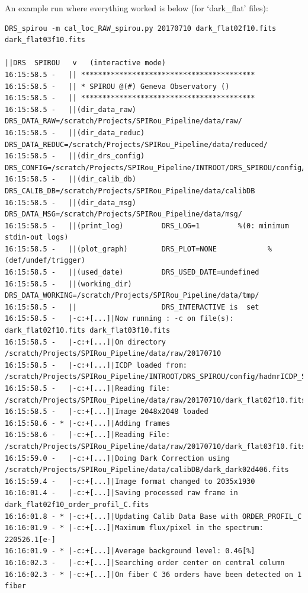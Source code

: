 An example run where everything worked is below (for `dark\_flat' files):

\begin{lstlisting}[style=text]
DRS_spirou -m cal_loc_RAW_spirou.py 20170710 dark_flat02f10.fits dark_flat03f10.fits

||DRS  SPIROU   v   (interactive mode)
16:15:58.5 -   || *****************************************
16:15:58.5 -   || * SPIROU @(#) Geneva Observatory ()
16:15:58.5 -   || *****************************************
16:15:58.5 -   ||(dir_data_raw)      DRS_DATA_RAW=/scratch/Projects/SPIRou_Pipeline/data/raw/
16:15:58.5 -   ||(dir_data_reduc)    DRS_DATA_REDUC=/scratch/Projects/SPIRou_Pipeline/data/reduced/
16:15:58.5 -   ||(dir_drs_config)    DRS_CONFIG=/scratch/Projects/SPIRou_Pipeline/INTROOT/DRS_SPIROU/config/
16:15:58.5 -   ||(dir_calib_db)      DRS_CALIB_DB=/scratch/Projects/SPIRou_Pipeline/data/calibDB
16:15:58.5 -   ||(dir_data_msg)      DRS_DATA_MSG=/scratch/Projects/SPIRou_Pipeline/data/msg/
16:15:58.5 -   ||(print_log)         DRS_LOG=1         %(0: minimum stdin-out logs)
16:15:58.5 -   ||(plot_graph)        DRS_PLOT=NONE            %(def/undef/trigger)
16:15:58.5 -   ||(used_date)         DRS_USED_DATE=undefined
16:15:58.5 -   ||(working_dir)       DRS_DATA_WORKING=/scratch/Projects/SPIRou_Pipeline/data/tmp/
16:15:58.5 -   ||                    DRS_INTERACTIVE is  set
16:15:58.5 -   |-c:+[...]|Now running : -c on file(s):  dark_flat02f10.fits dark_flat03f10.fits
16:15:58.5 -   |-c:+[...]|On directory /scratch/Projects/SPIRou_Pipeline/data/raw/20170710
16:15:58.5 -   |-c:+[...]|ICDP loaded from: /scratch/Projects/SPIRou_Pipeline/INTROOT/DRS_SPIROU/config/hadmrICDP_SPIROU.py
16:15:58.5 -   |-c:+[...]|Reading file: /scratch/Projects/SPIRou_Pipeline/data/raw/20170710/dark_flat02f10.fits
16:15:58.5 -   |-c:+[...]|Image 2048x2048 loaded
16:15:58.6 - * |-c:+[...]|Adding frames
16:15:58.6 -   |-c:+[...]|Reading File: /scratch/Projects/SPIRou_Pipeline/data/raw/20170710/dark_flat03f10.fits
16:15:59.0 -   |-c:+[...]|Doing Dark Correction using /scratch/Projects/SPIRou_Pipeline/data/calibDB/dark_dark02d406.fits
16:15:59.4 -   |-c:+[...]|Image format changed to 2035x1930
16:16:01.4 -   |-c:+[...]|Saving processed raw frame in dark_flat02f10_order_profil_C.fits
16:16:01.8 - * |-c:+[...]|Updating Calib Data Base with ORDER_PROFIL_C
16:16:01.9 - * |-c:+[...]|Maximum flux/pixel in the spectrum: 220526.1[e-]
16:16:01.9 - * |-c:+[...]|Average background level: 0.46[%]
16:16:02.3 -   |-c:+[...]|Searching order center on central column
16:16:02.3 - * |-c:+[...]|On fiber C 36 orders have been detected on 1 fiber

\end{lstlisting}
